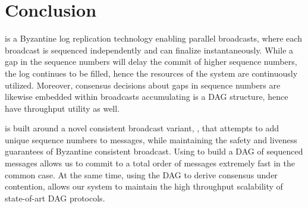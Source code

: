 \section{Conclusion}

\system is a Byzantine log replication technology enabling parallel broadcasts, where each broadcast is sequenced independently and can finalize instantaneously.
While a gap in the sequence numbers will delay the commit of higher sequence numbers, the log continues to be filled, hence the resources of the system are continuously utilized.
Moreover, consensus decisions about gaps in sequence numbers are likewise embedded within broadcasts accumulating is a DAG structure, hence have throughput utility as well.

\system is built around a novel consistent broadcast variant, \primitive,
that attempts to add unique sequence numbers to messages,
while maintaining the safety and liveness guarantees of Byzantine consistent broadcast.
Using \primitive to build a DAG of sequenced messages allows us to commit to a total order of messages extremely fast in the common case.
At the same time, using the DAG to derive consensus under contention, allows our system to maintain the high throughput scalability of state-of-art DAG protocols.

